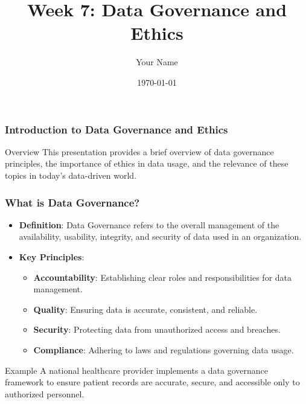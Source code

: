 \documentclass{beamer}
\title{Week 7: Data Governance and Ethics}
\author{Your Name}
\institute{Your Institution}
\date{\today}
\begin{document}
\frame{\titlepage}

\begin{frame}[fragile]
    \frametitle{Introduction to Data Governance and Ethics}
    \begin{block}{Overview}
        This presentation provides a brief overview of data governance principles, the importance of ethics in data usage, and the relevance of these topics in today's data-driven world.
    \end{block}
\end{frame}

\begin{frame}[fragile]
    \frametitle{What is Data Governance?}
    \begin{itemize}
        \item \textbf{Definition}: Data Governance refers to the overall management of the availability, usability, integrity, and security of data used in an organization.
        \item \textbf{Key Principles}:
        \begin{itemize}
            \item \textbf{Accountability}: Establishing clear roles and responsibilities for data management.
            \item \textbf{Quality}: Ensuring data is accurate, consistent, and reliable.
            \item \textbf{Security}: Protecting data from unauthorized access and breaches.
            \item \textbf{Compliance}: Adhering to laws and regulations governing data usage.
        \end{itemize}
    \end{itemize}
    \begin{block}{Example}
        A national healthcare provider implements a data governance framework to ensure patient records are accurate, secure, and accessible only to authorized personnel.
    \end{block}
\end{frame}
\end{document}
